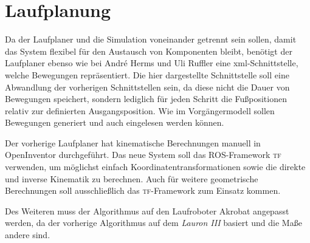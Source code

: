 \section{Laufplanung}

Da der Laufplaner und die Simulation voneinander getrennt sein sollen, damit das System flexibel für den Austausch von Komponenten bleibt, benötigt der Laufplaner ebenso wie bei André Herms und Uli Ruffler eine xml-Schnittstelle, welche Bewegungen repräsentiert. Die hier dargestellte Schnittstelle soll eine Abwandlung der vorherigen Schnittstellen sein, da diese nicht die Dauer von Bewegungen speichert, sondern lediglich für jeden Schritt die Fußpositionen relativ zur definierten Ausgangsposition. Wie im Vorgängermodell sollen Bewegungen generiert und auch eingelesen werden können.

Der vorherige Laufplaner hat kinematische Berechnungen manuell in OpenInventor durchgeführt. Das neue System soll das \ac{ROS}-Framework \textsc{tf} verwenden, um möglichst einfach Koordinatentransformationen sowie die direkte und inverse Kinematik zu berechnen. Auch für weitere geometrische Berechnungen soll ausschließlich das \textsc{tf}-Framework zum Einsatz kommen.

Des Weiteren muss der Algorithmus auf den Laufroboter Akrobat angepasst werden, da der vorherige Algorithmus auf dem \emph{Lauron III} basiert und die Maße andere sind.